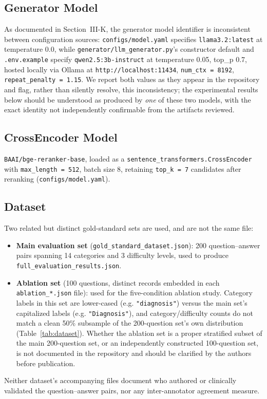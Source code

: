 \documentclass[conference]{IEEEtran}
\begin{document}
\subsection{Generator Model}
As documented in Section~III-K, the generator model identifier is inconsistent between configuration sources: \texttt{configs/model.yaml} specifies \texttt{llama3.2:latest} at temperature 0.0, while \texttt{generator/llm\_generator.py}'s constructor default and \texttt{.env.example} specify \texttt{qwen2.5:3b-instruct} at temperature 0.05, top\_p 0.7, hosted locally via Ollama at \texttt{http://localhost:11434}, \texttt{num\_ctx = 8192}, \texttt{repeat\_penalty = 1.15}. We report both values as they appear in the repository and flag, rather than silently resolve, this inconsistency; the experimental results below should be understood as produced by \emph{one} of these two models, with the exact identity not independently confirmable from the artifacts reviewed.

\subsection{CrossEncoder Model}
\texttt{BAAI/bge-reranker-base}, loaded as a \texttt{sentence\_transformers.CrossEncoder} with \texttt{max\_length = 512}, batch size 8, retaining \texttt{top\_k = 7} candidates after reranking (\texttt{configs/model.yaml}).

\subsection{Dataset}
Two related but distinct gold-standard sets are used, and are not the same file:
\begin{itemize}
    \item \textbf{Main evaluation set} (\texttt{gold\_standard\_dataset.json}): 200 question--answer pairs spanning 14 categories and 3 difficulty levels, used to produce \texttt{full\_evaluation\_results.json}.
    \item \textbf{Ablation set} (100 questions, distinct records embedded in each \texttt{ablation\_*.json} file): used for the five-condition ablation study. Category labels in this set are lower-cased (e.g. \texttt{"diagnosis"}) versus the main set's capitalized labels (e.g. \texttt{"Diagnosis"}), and category/difficulty counts do not match a clean 50\% subsample of the 200-question set's own distribution (Table~\ref{tab:dataset}). Whether the ablation set is a proper stratified subset of the main 200-question set, or an independently constructed 100-question set, is not documented in the repository and should be clarified by the authors before publication.
\end{itemize}
Neither dataset's accompanying files document who authored or clinically validated the question--answer pairs, nor any inter-annotator agreement measure.
\end{document}

